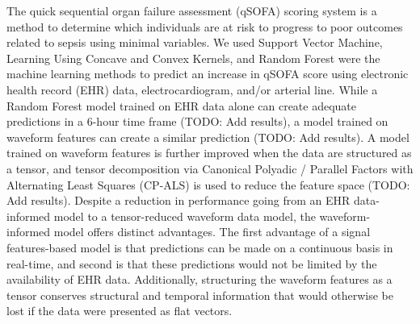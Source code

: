 
The quick sequential organ failure assessment (qSOFA) scoring system is a method to determine which individuals are at risk to progress to poor outcomes related to sepsis using minimal variables. We used Support Vector Machine, Learning Using Concave and Convex Kernels, and Random Forest were the machine learning methods to predict an increase in qSOFA score using electronic health record (EHR) data, electrocardiogram, and/or arterial line.
While a Random Forest model trained on EHR data alone can create adequate predictions in a 6-hour time frame (TODO: Add results), a model trained on waveform features can create a similar prediction (TODO: Add results). A model trained on waveform features is further improved when the data are structured as a tensor, and tensor decomposition via Canonical Polyadic / Parallel Factors with Alternating Least Squares (CP-ALS) is used to reduce the feature space (TODO: Add results).
Despite a reduction in performance going from an EHR data-informed model to a tensor-reduced waveform data model, the waveform-informed model offers distinct advantages. The first advantage of a signal features-based model is that predictions can be made on a continuous basis in real-time, and second is that these predictions would not be limited by the availability of EHR data. Additionally, structuring the waveform features as a tensor conserves structural and temporal information that would otherwise be lost if the data were presented as flat vectors.
